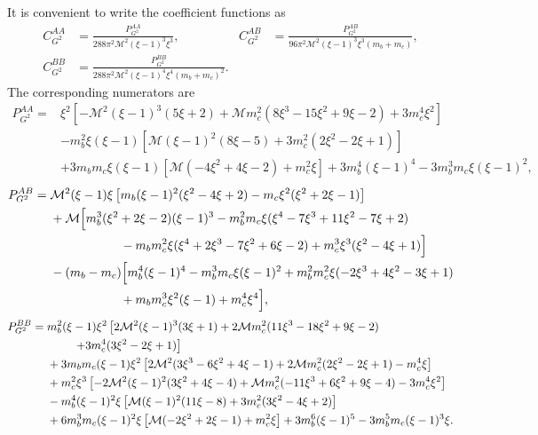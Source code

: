 It is convenient to write the coefficient functions as
\begin{align}
  C^{AA}_{G^2} &=
  \frac{P^{AA}_{G^2}}{288\pi^2\mathcal M^2(\xi-1)^3\xi^3},
  &
  C^{AB}_{G^2} &=
  \frac{P^{AB}_{G^2}}
  {96\pi^2\mathcal M^2(\xi-1)^3\xi^3(m_b+m_c)}, \nonumber\\
  C^{BB}_{G^2} &=
  \frac{P^{BB}_{G^2}}
  {288\pi^2\mathcal M^2(\xi-1)^4\xi^4(m_b+m_c)^2}.
\end{align}
The corresponding numerators are
\begin{align}
P^{AA}_{G^2}={}&
\xi^2\!\left[-\mathcal M^2(\xi-1)^3(5\xi+2)
+\mathcal M m_c^2(8\xi^3-15\xi^2+9\xi-2)
+3m_c^4\xi^2\right] \nonumber\\
&-m_b^2\xi(\xi-1)
\left[\mathcal M(\xi-1)^2(8\xi-5)
+3m_c^2(2\xi^2-2\xi+1)\right] \nonumber\\
&+3m_bm_c\xi(\xi-1)
\left[\mathcal M(-4\xi^2+4\xi-2)+m_c^2\xi\right]
+3m_b^4(\xi-1)^4
-3m_b^3m_c\xi(\xi-1)^2,
\end{align}
\begin{align}
P^{AB}_{G^2}={}&
\mathcal M^2(\xi-1)\xi
\left[m_b(\xi-1)^2(\xi^2-4\xi+2)
-m_c\xi^2(\xi^2+2\xi-1)\right] \nonumber\\
&+\mathcal M\Big[
m_b^3(\xi^2+2\xi-2)(\xi-1)^3
-m_b^2m_c\xi(\xi^4-7\xi^3+11\xi^2-7\xi+2) \nonumber\\
&\hspace{2.0cm}
-m_bm_c^2\xi(\xi^4+2\xi^3-7\xi^2+6\xi-2)
+m_c^3\xi^3(\xi^2-4\xi+1)\Big] \nonumber\\
&-(m_b-m_c)\Big[
m_b^4(\xi-1)^4
-m_b^3m_c\xi(\xi-1)^2
+m_b^2m_c^2\xi(-2\xi^3+4\xi^2-3\xi+1) \nonumber\\
&\hspace{2.0cm}
+m_bm_c^3\xi^2(\xi-1)
+m_c^4\xi^4\Big],
\end{align}
\begin{align}
P^{BB}_{G^2}={}&
m_b^2(\xi-1)\xi^2
\left[2\mathcal M^2(\xi-1)^3(3\xi+1)
+2\mathcal M m_c^2(11\xi^3-18\xi^2+9\xi-2) \right. \nonumber\\
&\hspace{0.8cm}\left.
+3m_c^4(3\xi^2-2\xi+1)\right] \nonumber\\
&+3m_bm_c(\xi-1)\xi^2
\left[2\mathcal M^2(3\xi^3-6\xi^2+4\xi-1)
+2\mathcal M m_c^2(2\xi^2-2\xi+1)-m_c^4\xi\right] \nonumber\\
&+m_c^2\xi^3
\left[-2\mathcal M^2(\xi-1)^2(3\xi^2+4\xi-4)
+\mathcal M m_c^2(-11\xi^3+6\xi^2+9\xi-4)
-3m_c^4\xi^2\right] \nonumber\\
&-m_b^4(\xi-1)^2\xi
\left[\mathcal M(\xi-1)^2(11\xi-8)
+3m_c^2(3\xi^2-4\xi+2)\right] \nonumber\\
&+6m_b^3m_c(\xi-1)^2\xi
\left[\mathcal M(-2\xi^2+2\xi-1)+m_c^2\xi\right]
+3m_b^6(\xi-1)^5
-3m_b^5m_c(\xi-1)^3\xi .
\end{align}

